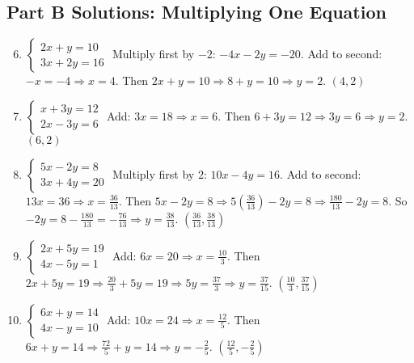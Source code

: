 \documentclass[12pt]{article}
\begin{document}
\subsection*{Part B Solutions: Multiplying One Equation}
\begin{enumerate}
  \setcounter{enumi}{5}
  \item \(\begin{cases} 2x + y = 10 \\ 3x + 2y = 16 \end{cases}\)  
  Multiply first by \(-2\): \(-4x - 2y = -20\). Add to second: \(-x = -4 \Rightarrow x = 4\). Then \(2x + y = 10 \Rightarrow 8 + y = 10 \Rightarrow y = 2\).  
  \(\boxed{(4, 2)}\)

  \item \(\begin{cases} x + 3y = 12 \\ 2x - 3y = 6 \end{cases}\)  
  Add: \(3x = 18 \Rightarrow x = 6\). Then \(6 + 3y = 12 \Rightarrow 3y = 6 \Rightarrow y = 2\).  
  \(\boxed{(6, 2)}\)

  \item \(\begin{cases} 5x - 2y = 8 \\ 3x + 4y = 20 \end{cases}\)  
  Multiply first by \(2\): \(10x - 4y = 16\). Add to second: \(13x = 36 \Rightarrow x = \tfrac{36}{13}\).  
  Then \(5x - 2y = 8 \Rightarrow 5(\tfrac{36}{13}) - 2y = 8 \Rightarrow \tfrac{180}{13} - 2y = 8\).  
  So \(-2y = 8 - \tfrac{180}{13} = -\tfrac{76}{13} \Rightarrow y = \tfrac{38}{13}\).  
  \(\boxed{(\tfrac{36}{13}, \tfrac{38}{13})}\)

  \item \(\begin{cases} 2x + 5y = 19 \\ 4x - 5y = 1 \end{cases}\)  
  Add: \(6x = 20 \Rightarrow x = \tfrac{10}{3}\). Then \(2x + 5y = 19 \Rightarrow \tfrac{20}{3} + 5y = 19 \Rightarrow 5y = \tfrac{37}{3} \Rightarrow y = \tfrac{37}{15}\).  
  \(\boxed{(\tfrac{10}{3}, \tfrac{37}{15})}\)

  \item \(\begin{cases} 6x + y = 14 \\ 4x - y = 10 \end{cases}\)  
  Add: \(10x = 24 \Rightarrow x = \tfrac{12}{5}\). Then \(6x + y = 14 \Rightarrow \tfrac{72}{5} + y = 14 \Rightarrow y = -\tfrac{2}{5}\).  
  \(\boxed{(\tfrac{12}{5}, -\tfrac{2}{5})}\)
\end{enumerate}
\end{document}
